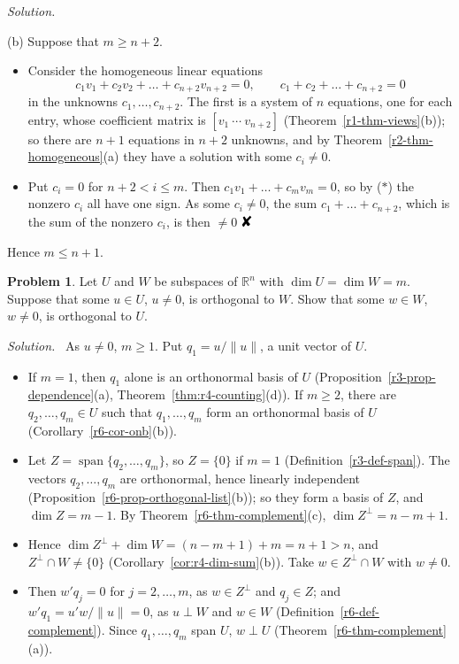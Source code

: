 \documentclass[12pt]{article}
\newcommand{\R}{\mathbb R}
\newcommand{\contradiction}{\mathord{\text{\large\ding{56}}}}
\DeclareMathOperator{\Span}{span}
\theoremstyle{definition}
\newtheorem{problem}{Problem}
\newenvironment{solution}{\par\noindent\textit{Solution.}\ }{\par\smallskip}
\begin{document}
\begin{solution}
\begin{itemize}
\end{itemize}
(b) Suppose that \(m\geqslant n+2\).
\begin{itemize}
\item Consider the homogeneous linear equations
\[
c_1v_1+c_2v_2+\dots+c_{n+2}v_{n+2}=0,\qquad c_1+c_2+\dots+c_{n+2}=0
\]
in the unknowns \(c_1,\dots,c_{n+2}\). The first is a system of \(n\) equations, one for each entry, whose coefficient
matrix is \([v_1\ \cdots\ v_{n+2}]\) (Theorem~\ref{r1-thm-views}(b)); so there are \(n+1\) equations in \(n+2\) unknowns,
and by Theorem~\ref{r2-thm-homogeneous}(a) they have a solution with some \(c_i\ne0\).
\item Put \(c_i=0\) for \(n+2<i\leqslant m\). Then \(c_1v_1+\dots+c_mv_m=0\), so by (\(*\)) the nonzero \(c_i\) all
have one sign. As some \(c_i\ne0\), the sum \(c_1+\dots+c_{n+2}\), which is the sum of the nonzero \(c_i\), is then
\(\ne0\) \(\contradiction\)
\end{itemize}
Hence \(m\leqslant n+1\).
\end{solution}

\begin{problem}\label{r6-ex-pr-perp-pair}
Let \(U\) and \(W\) be subspaces of \(\R^n\) with \(\dim U=\dim W=m\). Suppose that some \(u\in U\), \(u\ne0\), is
orthogonal to \(W\). Show that some \(w\in W\), \(w\ne0\), is orthogonal to \(U\).
\end{problem}
\begin{solution}
As \(u\ne0\), \(m\geqslant1\). Put \(q_1=u/\lVert u\rVert\), a unit vector of \(U\).
\begin{itemize}
\item If \(m=1\), then \(q_1\) alone is an orthonormal basis of \(U\) (Proposition~\ref{r3-prop-dependence}(a),
Theorem~\ref{thm:r4-counting}(d)). If \(m\geqslant2\), there are \(q_2,\dots,q_m\in U\) such that \(q_1,\dots,q_m\)
form an orthonormal basis of \(U\) (Corollary~\ref{r6-cor-onb}(b)).
\item Let \(Z=\Span\{q_2,\dots,q_m\}\), so \(Z=\{0\}\) if \(m=1\) (Definition~\ref{r3-def-span}). The vectors
\(q_2,\dots,q_m\) are orthonormal, hence linearly independent (Proposition~\ref{r6-prop-orthogonal-list}(b)); so they
form a basis of \(Z\), and \(\dim Z=m-1\). By Theorem~\ref{r6-thm-complement}(c), \(\dim Z^\perp=n-m+1\).
\item Hence \(\dim Z^\perp+\dim W=(n-m+1)+m=n+1>n\), and \(Z^\perp\cap W\ne\{0\}\) (Corollary~\ref{cor:r4-dim-sum}(b)).
Take \(w\in Z^\perp\cap W\) with \(w\ne0\).
\item Then \(w'q_j=0\) for \(j=2,\dots,m\), as \(w\in Z^\perp\) and \(q_j\in Z\); and \(w'q_1=u'w/\lVert u\rVert=0\), as
\(u\perp W\) and \(w\in W\) (Definition~\ref{r6-def-complement}). Since \(q_1,\dots,q_m\) span \(U\), \(w\perp U\)
(Theorem~\ref{r6-thm-complement}(a)).
\end{itemize}
\end{solution}
\end{document}
